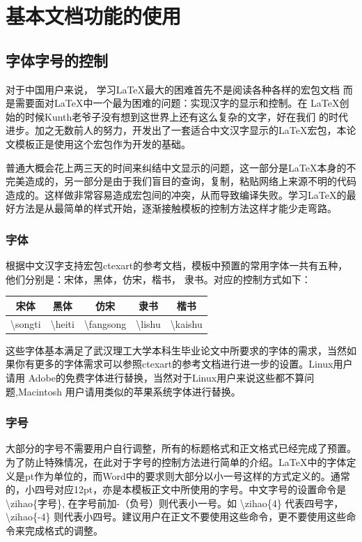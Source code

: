 \section{基本文档功能的使用}
\subsection{字体字号的控制}
对于中国用户来说， 学习\LaTeX 最大的困难首先不是阅读各种各样的宏包文档
而是需要面对\LaTeX 中一个最为困难的问题：实现汉字的显示和控制。在
\LaTeX 创始的时候Kunth老爷子没有想到这世界上还有这么复杂的文字，好在我们
的时代进步。加之无数前人的努力，开发出了一套适合中文汉字显示的\LaTeX 宏包，本论文模板正是使用这个宏包作为开发的基础。

普通大概会花上两三天的时间来纠结中文显示的问题，这一部分是\LaTeX 本身的不完美造成的，另一部分是由于我们盲目的查询，复制，粘贴网络上来源不明的代码造成的。这样做非常容易造成宏包间的冲突，从而导致编译失败。学习\LaTeX 的最好方法是从最简单的样式开始，逐渐接触模板的控制方法这样才能少走弯路。
\subsubsection{字体}
根据中文汉字支持宏包ctexart的参考文档，模板中预置的常用字体一共有五种，他们分别是：宋体，黑体，仿宋，楷书， 隶书。对应的控制方式如下：
\begin{center}
\begin{tabular}{ccccc}
\hline \rule[-2ex]{0pt}{5.5ex} { 宋体} & { 黑体} & { 仿宋} & { 隶书} & {楷书} \\ 
\hline \rule[-2ex]{0pt}{5.5ex} \textbackslash songti &\textbackslash  heiti  & \textbackslash fangsong & \textbackslash lishu & \textbackslash kaishu \\ 
\hline 
\end{tabular}  
\end{center}
这些字体基本满足了武汉理工大学本科生毕业论文中所要求的字体的需求，当然如果你有更多的字体需求可以参照ctexart的参考文档进行进一步的设置。Linux用户请用
Adobe的免费字体进行替换，当然对于Linux用户来说这些都不算问题,Macintosh 用户请用类似的苹果系统字体进行替换。
\subsubsection{字号}
大部分的字号不需要用户自行调整，所有的标题格式和正文格式已经完成了预置。为了防止特殊情况，在此对于字号的控制方法进行简单的介绍。\LaTeX 中的字体定义是pt作为单位的，而Word中的要求则大部分以小一号这样的方式定义的。通常的，小四号对应12pt，亦是本模板正文中所使用的字号。中文字号的设置命令是\textbackslash zihao\{字号\}, 在字号前加-（负号）则代表小一号。如 \textbackslash zihao\{4\} 代表四号字， \textbackslash zihao\{-4\} 则代表小四号。建议用户在正文不要使用这些命令，更不要使用这些命令来完成格式的调整。
